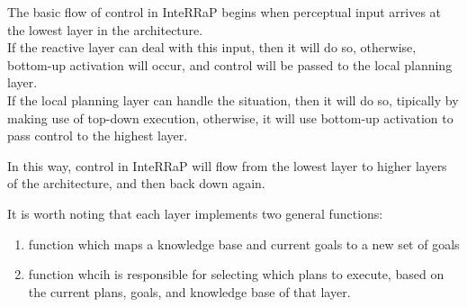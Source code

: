 The basic flow of control in InteRRaP begins when perceptual input arrives at the lowest layer in the architecture.\\
If the reactive layer can deal with this input, then it will do so, otherwise, bottom-up activation will occur, and control will be passed to the local planning layer.\\
If the local planning layer can handle the situation, then it will do so, tipically by making use of top-down execution, otherwise, it will use bottom-up activation to pass control to the highest layer.

In this way, control in InteRRaP will flow from the lowest layer to higher layers of the architecture, and then back down again.

It is worth noting that each layer implements two general functions:
\begin{enumerate}
\item {} function which maps a knowledge base and current goals to a new set of goals
\item {} function whcih is responsible for selecting which plans to execute, based on the current plans, goals, and knowledge base of that layer.
\end{enumerate}



